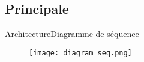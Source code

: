 \subsection{Principale}
\begin{frame}{Architecture}{Diagramme de séquence}
    \begin{figure}
         \centering
        \texttt{[image: diagram\_seq.png]}
        \label{fig:my_label}
    \end{figure}
\end{frame}
